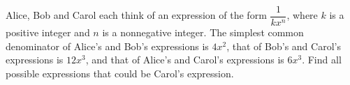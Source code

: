 Alice, Bob and Carol each think of an expression of the form $\dfrac{1}{kx^n}$, where $k$ is a positive integer and $n$ is a nonnegative integer. The simplest common denominator of Alice's and Bob's expressions is $4x^2$, that of Bob's and Carol's expressions is $12x^3$, and that of Alice's and Carol's expressions is $6x^3$. Find all possible expressions that could be Carol's expression.
